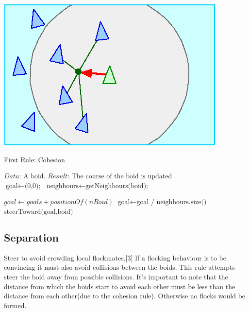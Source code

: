 \documentclass{article}
\begin{document}
\begin{center}
\includegraphics[scale=0.4]{cohesion.png} 
\end{center}

\begin{algorithm}
\caption{First Rule: Cohesion}\label{euclid}
\begin{algorithmic}[1]
\State $\textit{Data:   } \text{A boid.}$
\State $\textit{Result:   } \text{The course of the boid is updated}$
\\
\State $\text{goal} \gets \text{(0,0);}$
\State $\text{neighbours} \gets \text{getNeighbours(boid);}$

    \State $ goal \gets goals + positionOf(nBoid)$
\Endfor
\State $\text{goal} \gets \text{goal / neighbours.size()}$
\State $\text{steerToward(goal,boid)}$
\end{algorithmic}

\end{algorithm}

\subsection{Separation}

Steer to avoid crowding local flockmates.[3] If a flocking behaviour is to be convincing it must also avoid collisions between the boids. This rule attempts steer the boid away from possible collisions. It's important to note that the distance from which the boids start to avoid each other must be less than the distance from each other(due to the cohesion rule). Otherwise no flocks would be formed.\\
\end{document}
